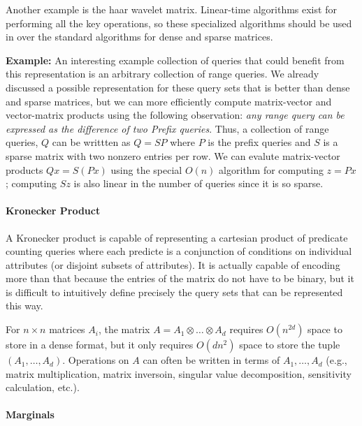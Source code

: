 Another example is the haar wavelet matrix.  Linear-time algorithms exist for performing all the key operations, so these specialized algorithms should be used in over the standard algorithms for dense and sparse matrices.  

\textbf{Example:} An interesting example collection of queries that could benefit from this representation is an arbitrary collection of range queries.  We already discussed a possible representation for these query sets that is better than dense and sparse matrices, but we can more efficiently compute matrix-vector and vector-matrix products using the following observation: \emph{any range query can be expressed as the difference of two Prefix queries}.  Thus, a collection of range queries, $Q$ can be writtten as $ Q = S P $ where $P$ is the prefix queries and $S$ is a sparse matrix with two nonzero entries per row.  We can evalute matrix-vector products $ Q x = S (P x) $ using the special $O(n)$ algorithm for computing $ z = P x $; computing $ S z $ is also linear in the number of queries since it is so sparse.  

\paragraph*{Kronecker Product}

A Kronecker product is capable of representing a cartesian product of predicate counting queries where each predicte is a conjunction of conditions on individual attributes (or disjoint subsets of attributes).  It is actually capable of encoding more than that because the entries of the matrix do not have to be binary, but it is difficult to intuitively define precisely the query sets that can be represented this way.  

For $n \times n$ matrices $ A_i $, the matrix $ A = A_1 \otimes \dots \otimes A_d $ requires $ O(n^{2d}) $ space to store in a dense format, but it only requires $ O(d n^2) $ space to store the tuple $(A_1, \dots, A_d)$.  Operations on $A$ can often be written in terms of $ A_1, \dots, A_d $ (e.g., matrix multiplication, matrix inversoin, singular value decomposition, sensitivity calculation, etc.).

\paragraph*{Marginals}
